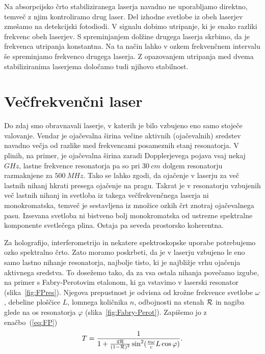 \begin{remark}
Na absorpcijsko črto stabiliziranega laserja navadno ne uporabljamo
direktno, temveč z njim kontroliramo drug laser. Del izhodne svetlobe iz
obeh laserjev zmešamo na detekcijski fotodiodi. V signalu dobimo utripanje,
ki je enako razliki frekvenc obeh laserjev. S spreminjanjem dolžine drugega
laserja skrbimo, da je frekvenca utripanja konstantna. Na ta način lahko v
ozkem frekvenčnem intervalu še spreminjamo frekvenco drugega laserja.
Z opazovanjem utripanja med dvema stabiliziranima laserjema določamo tudi
njihovo stabilnost.
\end{remark}

\section{Večfrekvenčni laser}
Do zdaj smo obravnavali laserje, v katerih je bilo vzbujeno eno samo stoječe
valovanje. Vendar je ojačevalna širina večine aktivnih (ojačevalnih) sredstev 
navadno večja od razlike med frekvencami posameznih 
stanj resonatorja. V plinih, na primer, je ojačevalna širina zaradi 
Dopplerjevega pojava vsaj nekaj $\si{GHz}$, lastne frekvence resonatorja 
pa so pri $30~\si{cm}$ dolgem resonatorju razmaknjene za $500~\si{MHz}$. 
Tako se lahko zgodi, da ojačenje v laserju za več lastnih nihanj hkrati 
presega ojačenje na pragu. Takrat je v resonatorju vzbujenih več lastnih nihanj in 
svetloba iz takega večfrekvenčnega laserja ni monokromatska,
temveč je sestavljena iz množice ozkih črt znotraj ojačevalnega pasu.
Izsevana svetloba ni bistveno bolj monokromatska od ustrezne spektralne 
komponente svetlečega plina. Ostaja pa seveda prostorsko koherentna.

Za holografijo, interferometrijo in nekatere spektroskopske uporabe
potrebujemo ozko spektralno črto. Zato moramo poskrbeti, da je v laserju vzbujeno le
eno samo lastno nihanje resonatorja, najbolje tisto, ki je najbližje vrhu ojačenja
aktivnega sredstva. To dosežemo tako, da za vsa ostala nihanja povečamo izgube,
na primer s Fabry-Perotovim etalonom, 
ki ga vstavimo v laserski resonator
(slika~\ref{fig:FPres}). Njegova prepustnost je odvisna od krožne frekvence 
svetlobe $\omega$, debeline ploščice $L$, lomnega količnika $n$, odbojnosti na stenah 
${\cal R}$ in nagiba glede na os resonatorja $\varphi$ (slika~\ref{fig:Fabry-Perot}).
Zapišemo jo z enačbo~(\ref{eq:FP}) 
\begin{equation}
T=\frac{1}{1+\frac{4{\cal {R}}}{(1-{\cal {R}})^{2}}\sin^{2}(\frac{n\omega}{c}L\cos \varphi )}.
\label{5.22}
\end{equation}

